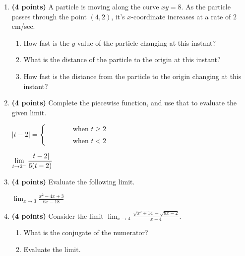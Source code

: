 \documentclass[12pt]{amsart}
\begin{document}
\begin{enumerate}
\vspace{2cm}
\newpage\def \b{4}\def \x{4}\def \y{2}\def \xchange{2}\def \ratrhs{8}\def \cirrhs{32}\def \hyprhs{0}\def \compy{4y^{2}}\def \ychangenum{4}\def \dist{20}\def \fracrat{12}\def \fraccirc{12}\def \frachyp{20}
\item {\bf (4 points)} 
 A particle is moving along the curve $xy = \ratrhs$. As the particle passes through the point $(\x,\y)$, it's $x$-coordinate increases at a rate of $\xchange$cm/sec. \begin{enumerate}
\item How fast is the $y$-value of the particle changing at this instant? \vfill \vfill
\item What is the distance of the particle to the origin at this instant? \vfill
\item How fast is the distance from the particle to the origin changing at this instant? \vfill \vfill
\end{enumerate}

\newpage\def \a{2}\def \k{6}\def \abstop{1}\def \ktop{0}
\item {\bf (4 points)} 
 Complete the piecewise function, and use that to evaluate the given limit.

\vspace{.5cm}

$|t- \a| = \begin{cases} \hspace{1cm} & \text{ when } t \geq \a \\ & \\ \hspace{1cm} & \text{ when } t < \a \end{cases}$

\vspace{.5cm}

$\displaystyle \lim_{t \rightarrow \a^-} \frac{\ifthenelse{\ktop=1}{\k}{}\ifthenelse{\abstop=1}{|t-\a|}{(t-\a)}}{\ifthenelse{\ktop=0}{\k}{}\ifthenelse{\abstop=0}{|t-\a|}{(t-\a)}}$

\vfill 
\def \a{3}\def \b{1}\def \k{6}\def \fancyp{x^{2}-4x^{}+3}\def \simplep{6x^{}-18}\def \fancyreduced{2}\def \niceanstop{\frac{1}{3}}\def \niceansbottom{3}
\item {\bf (4 points)} 
 Evaluate the following limit. 

$\displaystyle \lim_{x\rightarrow \a} \frac{\fancyp}{\simplep}$

\vfill 
\newpage\def \a{4}\def \b{4}\def \ab{16}\def \c{14}\def \amb{0}\def \ansroot{30}\def \firstroot{x^{2}+14}\def \secondroot{8x^{}-2}\def \porm{-1}
\item {\bf (4 points)} 
 Consider the limit $\displaystyle \lim_{x \rightarrow \a} \frac{\sqrt{\firstroot} - \sqrt{\secondroot}}{x-\a}$. \begin{enumerate}
\item What is the conjugate of the numerator? \vspace{3cm}
\item Evaluate the limit.
\end{enumerate}


\end{enumerate}
\end{document}
